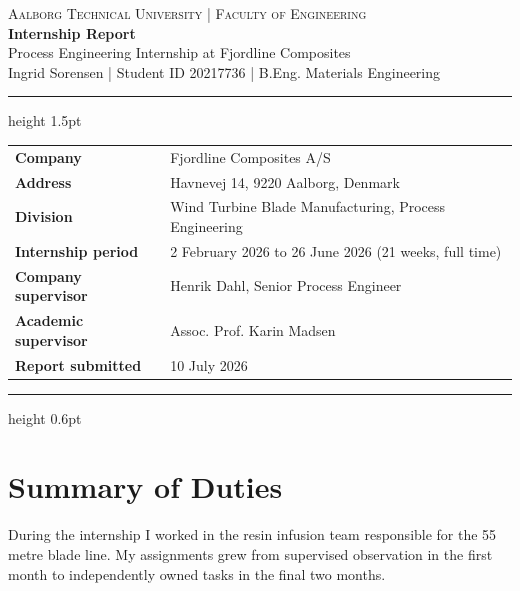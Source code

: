 \documentclass[11pt]{article}
\begin{document}
\begin{center}
  {\small\scshape Aalborg Technical University \quad | \quad Faculty of Engineering}\\[0.9em]
  {\Huge\bfseries\color{accent} Internship Report}\\[0.5em]
  {\large Process Engineering Internship at Fjordline Composites}\\[0.9em]
  Ingrid Sorensen \quad | \quad Student ID 20217736 \quad | \quad B.Eng. Materials Engineering
\end{center}

\vspace{0.4em}
{\color{accent}\hrule height 1.5pt}
\vspace{0.9em}

\begin{tabularx}{\textwidth}{@{}p{} X@{}}
\textbf{\color{accent}Company} & Fjordline Composites A/S \\
\textbf{\color{accent}Address} & Havnevej 14, 9220 Aalborg, Denmark \\
\textbf{\color{accent}Division} & Wind Turbine Blade Manufacturing, Process Engineering \\
\textbf{\color{accent}Internship period} & 2 February 2026 to 26 June 2026 (21 weeks, full time) \\
\textbf{\color{accent}Company supervisor} & Henrik Dahl, Senior Process Engineer \\
\textbf{\color{accent}Academic supervisor} & Assoc. Prof. Karin Madsen \\
\textbf{\color{accent}Report submitted} & 10 July 2026 \\
\end{tabularx}

\vspace{0.9em}
{\color{accent}\hrule height 0.6pt}

\section*{Summary of Duties}
During the internship I worked in the resin infusion team responsible for the
55 metre blade line. My assignments grew from supervised observation in the
first month to independently owned tasks in the final two months.
\end{document}
